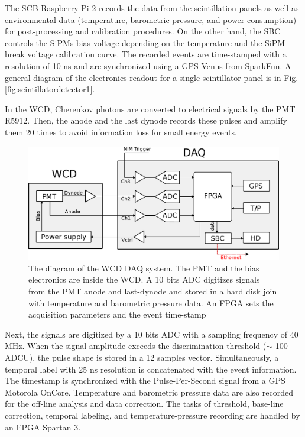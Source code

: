 \documentclass[letterpaper,11pt]{article}
\begin{document}
The SCB Raspberry Pi 2 records the data from the scintillation panels as well as environmental data (temperature, barometric pressure, and power consumption) for post-processing and calibration procedures. On the other hand, the SBC controls the SiPMs bias voltage depending on the temperature and the SiPM break voltage calibration curve. The recorded events are time-stamped with a resolution of 10 ns and are synchronized using a GPS Venus from SparkFun. A general diagram of the electronics readout for a single scintillator panel is in Fig. \ref{fig:scintillatordetector1}.

In the WCD, Cherenkov photons are converted to electrical signals by the PMT R5912. Then, the anode and the last dynode records these pulses and amplify them 20 times to avoid information loss for small energy events.

\begin{figure}[htb]
\centering
\includegraphics[width=0.9\columnwidth]{Figures/WCDDAQ.eps}
\caption{The diagram of the WCD DAQ system. The PMT and the bias electronics are inside the WCD. A 10 bits ADC digitizes signals from the PMT anode and last-dynode and stored in a hard disk join with temperature and barometric pressure data. An FPGA sets the acquisition parameters and the event time-stamp}
  \label{fig:WCD}
\end{figure}

Next, the signals are digitized by a 10 bits ADC with a sampling frequency of 40 MHz. When the signal amplitude exceeds the discrimination threshold ($\sim$ 100 ADCU), the pulse shape is stored in a 12 samples vector. Simultaneously, a temporal label with 25 ns resolution is concatenated with the event information. The timestamp is synchronized with the Pulse-Per-Second signal from a GPS Motorola OnCore. Temperature and barometric pressure data are also recorded for the off-line analysis and data correction. The tasks of threshold, base-line correction, temporal labeling, and temperature-pressure recording are handled by an FPGA Spartan 3.
\end{document}
